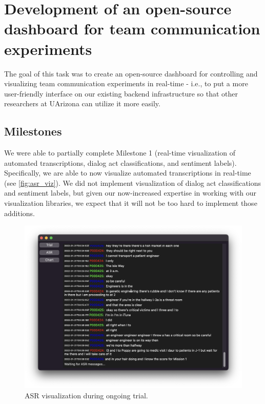\chapter{Development of an open-source dashboard for team communication experiments}

The goal of this task was to create an open-source dashboard for controlling
and visualizing team communication experiments in real-time - i.e., to put a
more user-friendly interface on our existing backend infrastructure so that
other researchers at UArizona can utilize it more easily.

\section{Milestones}

We were able to partially complete Milestone 1 (real-time visualization of
automated transcriptions, dialog act classifications, and sentiment labels).
Specifically, we are able to now visualize automated transcriptions in
real-time (see \autoref{fig:asr_viz}). 
We did not implement visualization of dialog act classifications and sentiment
labels, but given our now-increased expertise in working with our visualization
libraries, we expect that it will not be too hard to implement those additions. 


\begin{figure}
    \centering
    \includegraphics[width=\textwidth]{figures/asr_viz}
    \caption{ASR visualization during ongoing trial.}
    \label{fig:asr_viz}
\end{figure}


